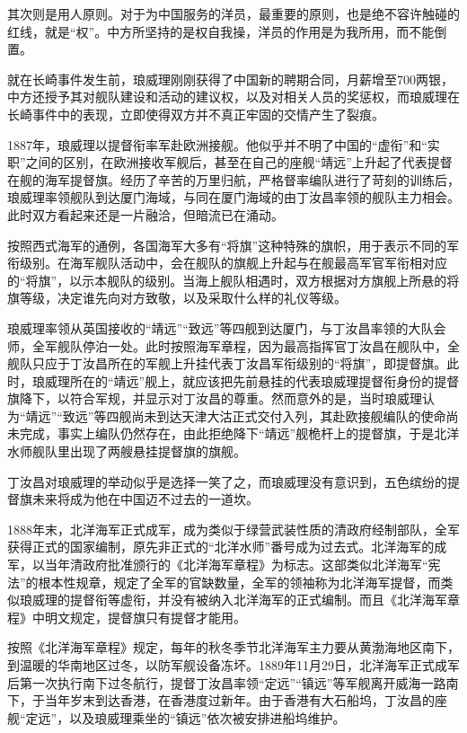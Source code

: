 \documentclass[12pt,UTF8]{ctexbook}
\begin{document}
其次则是用人原则。对于为中国服务的洋员，最重要的原则，也是绝不容许触碰的红线，就是“权”。中方所坚持的是权自我操，洋员的作用是为我所用，而不能倒置。

就在长崎事件发生前，琅威理刚刚获得了中国新的聘期合同，月薪增至700两银，中方还授予其对舰队建设和活动的建议权，以及对相关人员的奖惩权，而琅威理在长崎事件中的表现，立即使得双方并不真正牢固的交情产生了裂痕。

1887年，琅威理以提督衔率军赴欧洲接舰。他似乎并不明了中国的“虚衔”和“实职”之间的区别，在欧洲接收军舰后，甚至在自己的座舰“靖远”上升起了代表提督在舰的海军提督旗。经历了辛苦的万里归航，严格督率编队进行了苛刻的训练后，琅威理率领舰队到达厦门海域，与同在厦门海域的由丁汝昌率领的舰队主力相会。此时双方看起来还是一片融洽，但暗流已在涌动。

按照西式海军的通例，各国海军大多有“将旗”这种特殊的旗帜，用于表示不同的军衔级别。在海军舰队活动中，会在舰队的旗舰上升起与在舰最高军官军衔相对应的“将旗”，以示本舰队的级别。当海上舰队相遇时，双方根据对方旗舰上所悬的将旗等级，决定谁先向对方致敬，以及采取什么样的礼仪等级。

琅威理率领从英国接收的“靖远”“致远”等四舰到达厦门，与丁汝昌率领的大队会师，全军舰队停泊一处。此时按照海军章程，因为最高指挥官丁汝昌在舰队中，全舰队只应于丁汝昌所在的军舰上升挂代表丁汝昌军衔级别的“将旗”，即提督旗。此时，琅威理所在的“靖远”舰上，就应该把先前悬挂的代表琅威理提督衔身份的提督旗降下，以符合军规，并显示对丁汝昌的尊重。然而意外的是，当时琅威理认为“靖远”“致远”等四舰尚未到达天津大沽正式交付入列，其赴欧接舰编队的使命尚未完成，事实上编队仍然存在，由此拒绝降下“靖远”舰桅杆上的提督旗，于是北洋水师舰队里出现了两艘悬挂提督旗的旗舰。

丁汝昌对琅威理的举动似乎是选择一笑了之，而琅威理没有意识到，五色缤纷的提督旗未来将成为他在中国迈不过去的一道坎。

1888年末，北洋海军正式成军，成为类似于绿营武装性质的清政府经制部队，全军获得正式的国家编制，原先非正式的“北洋水师”番号成为过去式。北洋海军的成军，以当年清政府批准颁行的《北洋海军章程》为标志。这部类似北洋海军“宪法”的根本性规章，规定了全军的官缺数量，全军的领袖称为北洋海军提督，而类似琅威理的提督衔等虚衔，并没有被纳入北洋海军的正式编制。而且《北洋海军章程》中明文规定，提督旗只有提督才能用。

按照《北洋海军章程》规定，每年的秋冬季节北洋海军主力要从黄渤海地区南下，到温暖的华南地区过冬，以防军舰设备冻坏。1889年11月29日，北洋海军正式成军后第一次执行南下过冬航行，提督丁汝昌率领“定远”“镇远”等军舰离开威海一路南下，于当年岁末到达香港，在香港度过新年。由于香港有大石船坞，丁汝昌的座舰“定远”，以及琅威理乘坐的“镇远”依次被安排进船坞维护。
\end{document}
